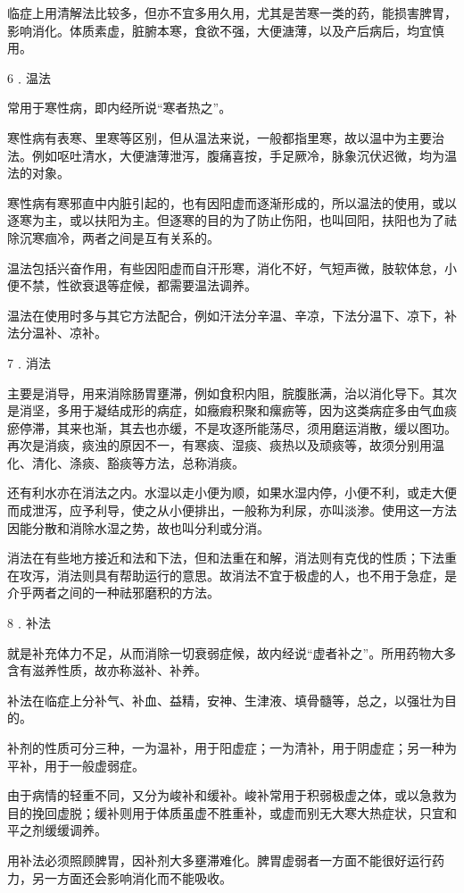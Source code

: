 \documentclass[a4paper,12pt,UTF8,twoside]{ctexbook}
\begin{document}
临症上用清解法比较多，但亦不宜多用久用，尤其是苦寒一类的药，能损害脾胃，影响消化。体质素虚，脏腑本寒，食欲不强，大便溏薄，以及产后病后，均宜慎用。

6﹒温法

常用于寒性病，即内经所说“寒者热之”。

寒性病有表寒、里寒等区别，但从温法来说，一般都指里寒，故以温中为主要治法。例如呕吐清水，大便溏薄泄泻，腹痛喜按，手足厥冷，脉象沉伏迟微，均为温法的对象。

寒性病有寒邪直中内脏引起的，也有因阳虚而逐渐形成的，所以温法的使用，或以逐寒为主，或以扶阳为主。但逐寒的目的为了防止伤阳，也叫回阳，扶阳也为了祛除沉寒痼冷，两者之间是互有关系的。

温法包括兴奋作用，有些因阳虚而自汗形寒，消化不好，气短声微，肢软体怠，小便不禁，性欲衰退等症候，都需要温法调养。

温法在使用时多与其它方法配合，例如汗法分辛温、辛凉，下法分温下、凉下，补法分温补、凉补。

7﹒消法

主要是消导，用来消除肠胃壅滞，例如食积内阻，脘腹胀满，治以消化导下。其次是消坚，多用于凝结成形的病症，如癥瘕积聚和瘰疬等，因为这类病症多由气血痰瘀停滞，其来也渐，其去也亦缓，不是攻逐所能荡尽，须用磨运消散，缓以图功。再次是消痰，痰浊的原因不一，有寒痰、湿痰、痰热以及顽痰等，故须分别用温化、清化、涤痰、豁痰等方法，总称消痰。

还有利水亦在消法之内。水湿以走小便为顺，如果水湿内停，小便不利，或走大便而成泄泻，应予利导，使之从小便排出，一般称为利尿，亦叫淡渗。使用这一方法因能分散和消除水湿之势，故也叫分利或分消。

消法在有些地方接近和法和下法，但和法重在和解，消法则有克伐的性质；下法重在攻泻，消法则具有帮助运行的意思。故消法不宜于极虚的人，也不用于急症，是介乎两者之间的一种祛邪磨积的方法。

8﹒补法

就是补充体力不足，从而消除一切衰弱症候，故内经说“虚者补之”。所用药物大多含有滋养性质，故亦称滋补、补养。

补法在临症上分补气、补血、益精，安神、生津液、填骨髓等，总之，以强壮为目的。

补剂的性质可分三种，一为温补，用于阳虚症；一为清补，用于阴虚症；另一种为平补，用于一般虚弱症。

由于病情的轻重不同，又分为峻补和缓补。峻补常用于积弱极虚之体，或以急救为目的挽回虚脱；缓补则用于体质虽虚不胜重补，或虚而别无大寒大热症状，只宜和平之剂缓缓调养。

用补法必须照顾脾胃，因补剂大多壅滞难化。脾胃虚弱者一方面不能很好运行药力，另一方面还会影响消化而不能吸收。
\end{document}
